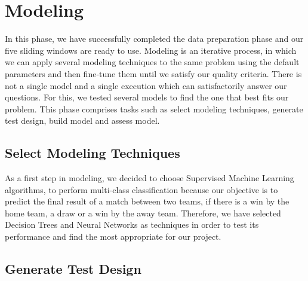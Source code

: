 \chapter{Modeling}
\label{cha:Modelling}

In this phase, we have successfully completed the data preparation phase and our five sliding windows are ready to use. \newline \newline
Modeling is an iterative process, in which we can apply several modeling techniques to the same problem using the default parameters and then fine-tune them until we satisfy our quality criteria. There is not a single model and a single execution which can satisfactorily answer our questions. For this, we tested several models to find the one that best fits our problem.\newline \newline
This phase comprises tasks such as select modeling techniques, generate test design, build model and assess model.


\section{Select Modeling Techniques}

As a first step in modeling, we decided to choose Supervised Machine Learning algorithms, to perform multi-class classification because our objective is to predict the final result of a match between two teams, if there is a win by the home team, a draw or a win by the away team. \newline \newline
Therefore, we have selected Decision Trees and Neural Networks as techniques in order to test its performance and find the most appropriate for our project.

\section{Generate Test Design}

